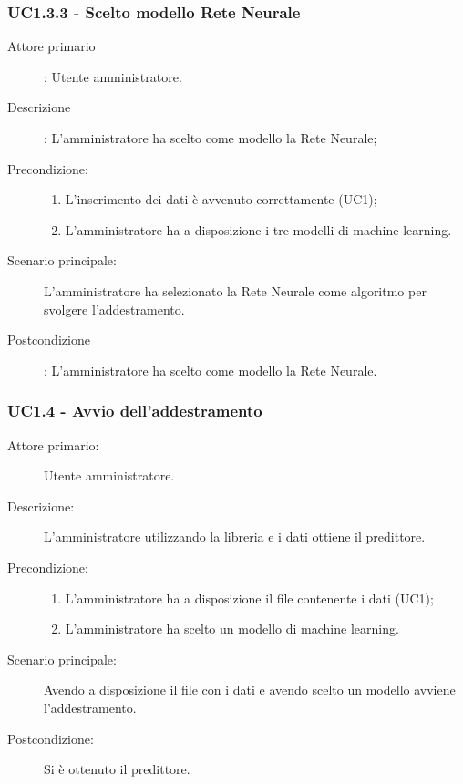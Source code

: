 \subsubsection{UC1.3.3 - Scelto modello Rete Neurale}
\label{sssec:uc1.3.3}
\begin{description}
  \item[Attore primario]: Utente amministratore.
  \item[Descrizione]: L'amministratore ha scelto come modello la Rete Neurale;
  \item[Precondizione:]
  \begin{enumerate}
    \item L'inserimento dei dati è avvenuto correttamente (UC1);
    \item L'amministratore ha a disposizione i tre modelli di machine learning.
  \end{enumerate}
  \item[Scenario principale:] L'amministratore ha selezionato la Rete Neurale come algoritmo per svolgere l'addestramento.
  \item[Postcondizione]: L'amministratore ha scelto come modello la Rete Neurale.
\end{description}


\subsubsection{UC1.4 - Avvio dell'addestramento}
\label{sssec:uc1.4}
\begin{description}
  \item[Attore primario:] Utente amministratore.
  \item[Descrizione:] L'amministratore utilizzando la libreria e i dati ottiene il predittore.
  \item[Precondizione:]
  \begin{enumerate}
    \item L'amministratore ha a disposizione il file contenente i dati (UC1);
    \item L'amministratore ha scelto un modello di machine learning.
  \end{enumerate}
  \item[Scenario principale:] Avendo a disposizione il file con i dati e avendo scelto un modello avviene l'addestramento.
  \item[Postcondizione:] Si è ottenuto il predittore.
\end{description}

